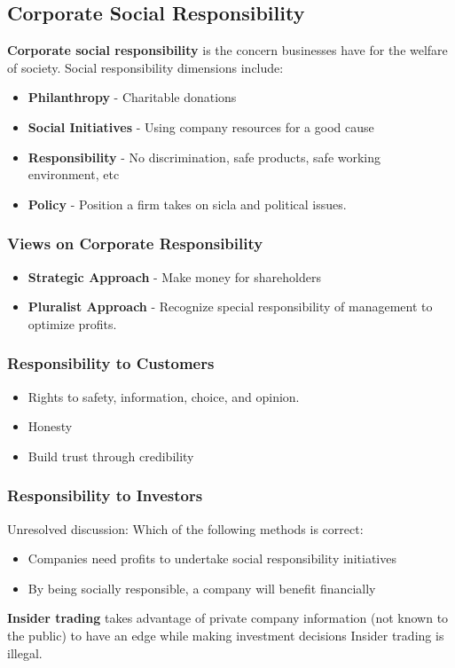 \documentclass[english, 12pt]{article}
\begin{document}
\subsection{Corporate Social Responsibility}
\begin{defn}[CSR] 
\textbf{Corporate social responsibility} is the concern businesses have for the welfare of society. Social responsibility dimensions include:
\begin{itemize}
\item \textbf{Philanthropy} - Charitable donations
\item \textbf{Social Initiatives} - Using company resources for a good cause
\item \textbf{Responsibility} - No discrimination, safe products, safe working environment, etc
\item \textbf{Policy} - Position a firm takes on sicla and political issues.
\end{itemize}
\end{defn}
\subsubsection*{Views on Corporate Responsibility}
\begin{itemize}
\item \textbf{Strategic Approach} - Make money for shareholders
\item \textbf{Pluralist Approach} - Recognize special responsibility of management to optimize profits.
\end{itemize}
\subsubsection*{Responsibility to Customers}
\begin{itemize}
\item Rights to safety, information, choice, and opinion.
\item Honesty
\item Build trust through credibility
\end{itemize}
\subsubsection*{Responsibility to Investors}
Unresolved discussion: Which of the following methods is correct:
\begin{itemize}
\item Companies need profits to undertake social responsibility initiatives
\item By being socially responsible, a company will benefit financially
\end{itemize}
\begin{defn}
\textbf{Insider trading} takes advantage of private company information (not known to the public) to have an edge while making investment decisions Insider trading is illegal.
\end{defn}
\end{document}

